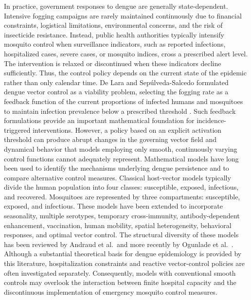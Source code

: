 \documentclass[preprint]{elsarticle}
\begin{document}
In practice, government responses to dengue are generally state-dependent. Intensive fogging campaigns are rarely maintained continuously due to financial constraints, logistical limitations, environmental concerns, and the risk of insecticide resistance. Instead, public health authorities typically intensify mosquito control when surveillance indicators, such as reported infections, hospitalized cases, severe cases, or mosquito indices, cross a prescribed alert level. The intervention is relaxed or discontinued when these indicators decline sufficiently. Thus, the control policy depends on the current state of the epidemic rather than only calendar time. De Lara and Sepúlveda-Salcedo formulated dengue vector control as a viability problem, selecting the fogging rate as a feedback function of the current proportions of infected humans and mosquitoes to maintain infection prevalence below a prescribed threshold \cite{de2016viable}. Such feedback formulations provide an important mathematical foundation for incidence-triggered interventions. However, a policy based on an explicit activation threshold can produce abrupt changes in the governing vector field and dynamical behavior that models employing only smooth, continuously varying control functions cannot adequately represent. Mathematical models have long been used to identify the mechanisms underlying dengue persistence and to compare alternative control measures. Classical host-vector models typically divide the human population into four classes: susceptible, exposed, infectious, and recovered. Mosquitoes are represented by three compartments: susceptible, exposed, and infectious. These models have been extended to incorporate seasonality, multiple serotypes, temporary cross-immunity, antibody-dependent enhancement, vaccination, human mobility, spatial heterogeneity, behavioral responses, and optimal vector control. The structural diversity of these models has been reviewed by Andraud et al.\ and more recently by Ogunlade et al.\ \cite{andraud2012dynamic,ogunlade2023systematic}. Although a substantial theoretical basis for dengue epidemiology is provided by this literature, hospitalization constraints and reactive vector-control policies are often investigated separately. Consequently, models with conventional smooth controls may overlook the interaction between finite hospital capacity and the discontinuous implementation of emergency mosquito control measures.
\end{document}
